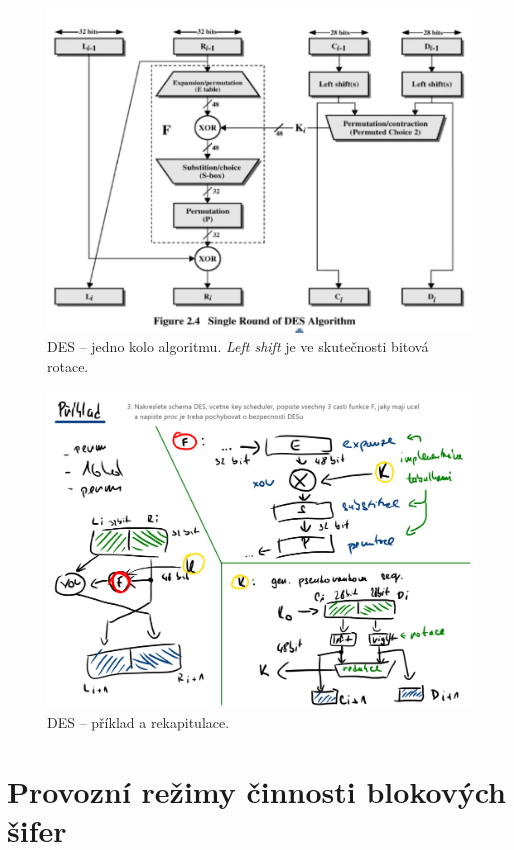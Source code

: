 \begin{figure}[H]
    \centering
    \includegraphics[width=1\linewidth]{des_single_round.png}
    \caption{DES -- jedno kolo algoritmu. \textit{Left shift} je ve skutečnosti bitová rotace.}
\end{figure}

\begin{figure}[H]
    \centering
    \includegraphics[width=1\linewidth]{des_example.pdf}
    \caption{DES -- příklad a rekapitulace.}
\end{figure}


\section{Provozní režimy činnosti blokových šifer}

